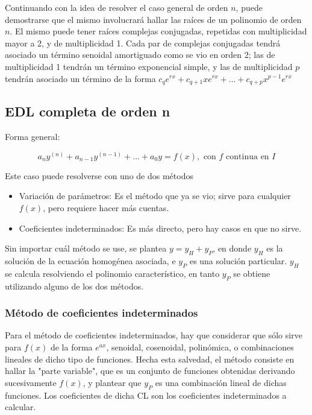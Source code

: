 \documentclass{article}
\begin{document}
Continuando con la idea de resolver el caso general de orden $n$, puede demostrarse que el mismo involucrará hallar las raíces de un polinomio de orden $n$. El mismo puede tener raíces complejas conjugadas, repetidas con multiplicidad mayor a 2, y de multiplicidad 1. Cada par de complejas conjugadas tendrá asociado un término senoidal amortiguado como se vio en orden 2; las de multiplicidad 1 tendrán un término exponencial simple, y las de multiplicidad $p$ tendrán asociado un término de la forma $c_{q}e^{r x} + c_{q+1} x e^{r x} + \ldots + c_{q+p} x^{p-1} e^{r x}$

\subsection{EDL completa de orden n}

Forma general:

\begin{equation}
a_n y^{(n)} + a_{n-1} y^{(n-1)} + \ldots + a_0 y = f(x), \text{ con } f \text{ continua en } I
\end{equation}

Este caso puede resolverse con uno de dos métodos

\begin{itemize}
\item Variación de parámetros: Es el método que ya se vio; sirve para cualquier $f(x)$, pero requiere hacer más cuentas.
\item Coeficientes indeterminados: Es más directo, pero hay casos en que no sirve.
\end{itemize}

Sin importar cuál método se use, se plantea $y = y_H + y_P$, en donde $y_H$ es la solución de la ecuación homogénea asociada, e $y_P$ es una solución particular. $y_H$ se calcula resolviendo el polinomio característico, en tanto $y_P$ se obtiene utilizando alguno de los dos métodos.

\subsubsection{Método de coeficientes indeterminados}

Para el método de coeficientes indeterminados, hay que considerar que sólo sirve para $f(x)$ de la forma $e^{a x}$, senoidal, cosenoidal, polinómica, o combinaciones lineales de dicho tipo de funciones. Hecha esta salvedad, el método consiste en hallar la "parte variable", que es un conjunto de funciones obtenidas derivando sucesivamente $f(x)$, y plantear que $y_P$ es una combinación lineal de dichas funciones. Los coeficientes de dicha CL son los coeficientes indeterminados a calcular.
\end{document}
